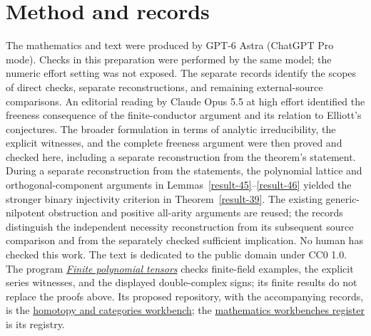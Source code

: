 \documentclass[11pt,a4paper]{article}
\theoremstyle{definition}
\newcommand{\workbenchurl}{https://github.com/KokunoYumeto/homotopy-and-categories-workbench}
\newcommand{\recordurl}{https://github.com/KokunoYumeto/mathematics-workbenches}
\begin{document}
\section*{Method and records}
The mathematics and text were produced by GPT-6 Astra (ChatGPT Pro mode).
Checks in this preparation were performed by the same model; the
numeric effort setting was not exposed.  The separate records identify
the scopes of direct checks, separate reconstructions, and remaining
external-source comparisons.
An editorial reading by Claude Opus 5.5 at high effort identified
the freeness consequence of the finite-conductor argument and its
relation to Elliott's conjectures. The broader formulation in terms
of analytic irreducibility, the explicit witnesses, and the complete
freeness argument were then proved and checked here, including a
separate reconstruction from the theorem's statement.
During a separate reconstruction from the statements, the polynomial
lattice and orthogonal-component arguments in
Lemmas~\ref{result-45}--\ref{result-46} yielded the stronger binary
injectivity criterion in Theorem~\ref{result-39}. The existing
generic-nilpotent obstruction and positive all-arity arguments are
reused; the records distinguish the independent necessity reconstruction
from its subsequent source comparison and from the separately checked
sufficient implication.
No human has checked this work.  The text is dedicated to the public
domain under CC0 1.0.  The program \href{\workbenchurl}{\emph{Finite polynomial tensors}} checks finite-field
examples, the explicit series witnesses, and the displayed double-complex signs; its finite results
do not replace the proofs above. Its proposed repository, with the
accompanying records, is the
\href{\workbenchurl}{homotopy and categories workbench}; the
\href{\recordurl}{mathematics workbenches register} is its registry.


\end{document}
